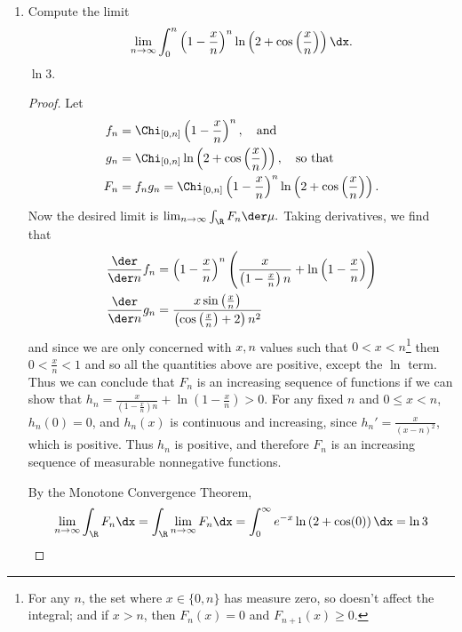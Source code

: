 \documentclass[12pt,letterpaper]{article}
\begin{document}
\begin{enumerate}
\pagebreak
\item Compute the limit 
$$\lim_{n\to\infty} \int_0^n \left(1-\frac{x}{n}\right)^n \ln\left(2+\cos\left(\frac{x}{n}\right)\right)\dx . $$
\answer	$\ln3$. 
\begin{proof}
Let 
\begin{align*}
f_n&=\Chi_{[0,n]} \left(1-\frac{x}{n}\right)^n, \quad\text{and} \\
g_n&=\Chi_{[0,n]} \ln\left(2+\cos\left(\frac{x}{n}\right)\right), \quad\text{so that} \\
F_n&=f_ng_n=\Chi_{[0,n]} \left(1-\frac{x}{n}\right)^n \ln\left(2+\cos\left(\frac{x}{n}\right)\right).
\end{align*}
Now the desired limit is $ \lim_{n\to\infty} \int_\R F_n \der\mu.$ Taking derivatives, we find that 
\begin{align*}
\frac{\der}{\der n}f_n &= \left(1-\frac{x}{n}\right)^n\left(\frac{x}{\left(1-\frac{x}{n}\right)n}+\ln\left(1-\frac{x}{n}\right)\right)\\
\frac{\der}{\der n}g_n &= \frac{x\sin\left(\frac{x}{n}\right)}{\left(\cos\left(\frac{x}{n}\right)+2\right)n^2}
\end{align*}
and since we are only concerned with $x,n$ values such that $0<x<n$\footnote{For any $n$, the set where $x\in\{0,n\}$ has measure zero, so doesn't affect the integral; and if $x>n$, then $F_n(x)=0$ and $F_{n+1}(x)\geq0$.} then $0<\frac{x}{n}<1$ and so all the quantities above are positive, except the $\ln$ term. Thus we can conclude that $F_n$ is an increasing sequence of functions if we can show that $h_n=\frac{x}{\left(1-\frac{x}{n}\right)n}+\ln\left(1-\frac{x}{n}\right)>0$. For any fixed $n$ and $0\leq x<n$, $h_n(0)=0$, and $h_n(x)$ is continuous and increasing, since $h_n'= \frac{x}{(x-n)^2}$, which is positive. Thus $h_n$ is positive, and therefore $F_n$ is an increasing sequence of measurable nonnegative functions. 

By the Monotone Convergence Theorem, 
$$\lim_{n\to\infty}\int_\R F_n \dx = \int_\R \lim_{n\to\infty} F_n \dx = \int_0^\infty e^{-x}\ln\left(2+\cos(0)\right)\dx = \ln3 $$

\end{proof}

\end{enumerate}
\end{document}
